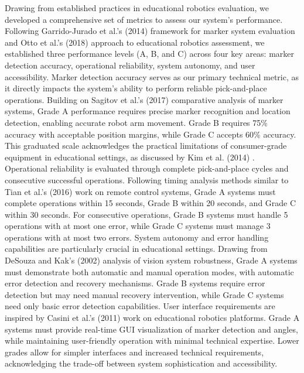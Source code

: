 \documentclass[10pt,twocolumn]{article}
\begin{document}
Drawing from established practices in educational robotics evaluation, we developed a comprehensive set of metrics to assess our system's performance. Following Garrido-Jurado et al.'s (2014) \cite{garrido2014automatic} framework for marker system evaluation and Otto et al.'s (2018) \cite{otto2018teaching} approach to educational robotics assessment, we established three performance levels (A, B, and C) across four key areas: marker detection accuracy, operational reliability, system autonomy, and user accessibility.
Marker detection accuracy serves as our primary technical metric, as it directly impacts the system's ability to perform reliable pick-and-place operations. Building on Sagitov et al.'s (2017) \cite{sagitov2017comparing} comparative analysis of marker systems, Grade A performance requires precise marker recognition and location detection, enabling accurate robot arm movement. Grade B requires 75\% accuracy with acceptable position margins, while Grade C accepts 60\% accuracy. This graduated scale acknowledges the practical limitations of consumer-grade equipment in educational settings, as discussed by Kim et al. (2014) \cite{kim2014using}.
Operational reliability is evaluated through complete pick-and-place cycles and consecutive successful operations. Following timing analysis methods similar to Tian et al.'s (2016) \cite{tian2016development} work on remote control systems, Grade A systems must complete operations within 15 seconds, Grade B within 20 seconds, and Grade C within 30 seconds. For consecutive operations, Grade B systems must handle 5 operations with at most one error, while Grade C systems must manage 3 operations with at most two errors.
System autonomy and error handling capabilities are particularly crucial in educational settings. Drawing from DeSouza and Kak's (2002) \cite{desouza2002vision} analysis of vision system robustness, Grade A systems must demonstrate both automatic and manual operation modes, with automatic error detection and recovery mechanisms. Grade B systems require error detection but may need manual recovery intervention, while Grade C systems need only basic error detection capabilities.
User interface requirements are inspired by Casini et al.'s (2011) \cite{casini2011lego} work on educational robotics platforms. Grade A systems must provide real-time GUI visualization of marker detection and angles, while maintaining user-friendly operation with minimal technical expertise. Lower grades allow for simpler interfaces and increased technical requirements, acknowledging the trade-off between system sophistication and accessibility.
\end{document}
